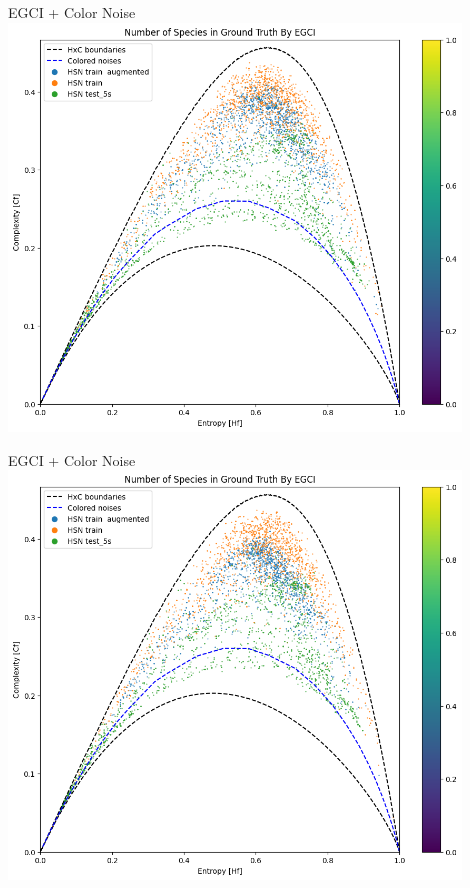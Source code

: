 \begin{frame}{EGCI + Color Noise}
    \centering
    \includegraphics[height=0.9\textheight,width=0.9\textwidth,keepaspectratio]{images/pink_noise_1-5_SNR.png}
\end{frame}

\begin{frame}{EGCI + Color Noise}
    \centering
    \includegraphics[height=0.9\textheight,width=0.9\textwidth,keepaspectratio]{images/pink_noise_0.5-3_SNR.png}
\end{frame}

